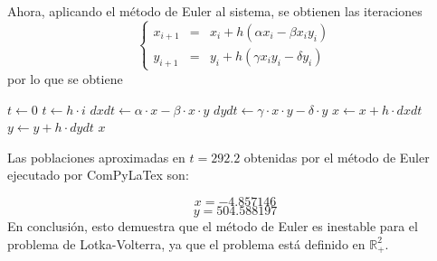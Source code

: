 \documentclass{book}
\begin{document}
Ahora, aplicando el método de Euler al sistema, se obtienen las iteraciones
\[
\left \{
\begin{array}{rrrr}
    x_{i+1} & = &x_i + h(\alpha x_i - \beta x_i y_i) \\
    y_{i+1} & = &y_i + h(\gamma x_i y_i - \delta y_i)
\end{array}
\right .
\]
por lo que se obtiene
\begin{algorithm}[H]
\caption{Pseudocódigo de Euler explícito para el sistema de Lotka-Volterra}
\label{alg:calc:x}
\begin{algorithmic}
    \STATE $t \gets 0$
        \STATE $t \gets h \cdot i$
        \STATE $dxdt \gets \alpha \cdot x - \beta \cdot x \cdot y$
        \STATE $dydt \gets \gamma \cdot x \cdot y - \delta \cdot y$
        \STATE $x \gets x + h \cdot dxdt$
        \STATE $y \gets y + h \cdot dydt$
    \ENDFOR
    \RETURN $x$
\end{algorithmic}
\end{algorithm}

Las poblaciones aproximadas en $t = 292.2$ obtenidas por el método de Euler ejecutado por ComPyLaTex son:

\begin{equation}
    x =
    -4.857146
    \label{eq:res:x}
\end{equation}
\begin{equation}
    y =
    504.588197
    \label{eq:res:y}
\end{equation}
En conclusión, esto demuestra que el método de Euler es inestable para el problema de Lotka-Volterra, ya que el problema está definido en $\mathbb{R}^2_+$.
\end{document}
